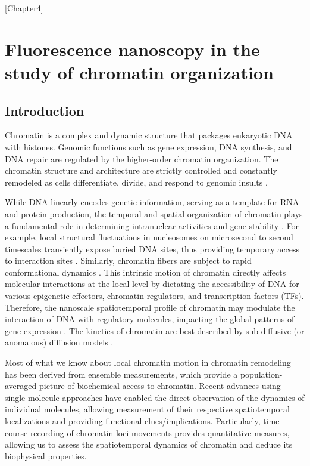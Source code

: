 [Chapter4]

\chapter{Fluorescence nanoscopy in the study of chromatin organization}

\section{Introduction}

Chromatin is a complex and dynamic structure that packages eukaryotic DNA with histones. Genomic functions such as gene expression, DNA synthesis, and DNA repair are regulated by the higher-order chromatin organization. The chromatin structure and architecture are strictly controlled and constantly remodeled as cells differentiate, divide, and respond to genomic insults \parencite{Auerbach2009,Chien2009,Clapier2009,Misteli2007,Vidi2014}.

While DNA linearly encodes genetic information, serving as a template for RNA and protein production, the temporal and spatial organization of chromatin plays a fundamental role in determining intranuclear activities and gene stability \parencite{Cuvier2017,Dion2013}. For example, local structural fluctuations in nucleosomes on microsecond to second timescales transiently expose buried DNA sites, thus providing temporary access to interaction sites \parencite{Choy2012}. Similarly, chromatin fibers are subject to rapid conformational dynamics \parencite{Li2016}. This intrinsic motion of chromatin directly affects molecular interactions at the local level by dictating the accessibility of DNA for various epigenetic effectors, chromatin regulators, and transcription factors (TFs). Therefore, the nanoscale spatiotemporal profile of chromatin may modulate the interaction of DNA with regulatory molecules, impacting the global patterns of gene expression \parencite{Bintu2018,Boettiger2016,Grant2018,Xu2018}. The kinetics of chromatin are best described by sub-diffusive (or anomalous) diffusion models \parencite{Fierz2019,Shukron2019}.

Most of what we know about local chromatin motion in chromatin remodeling has been derived from ensemble measurements, which provide a population-averaged picture of biochemical access to chromatin. Recent advances using single-molecule approaches have enabled the direct observation of the dynamics of individual molecules, allowing measurement of their respective spatiotemporal localizations and providing functional clues/implications. Particularly, time-course recording of chromatin loci movements provides quantitative measures, allowing us to assess the spatiotemporal dynamics of chromatin and deduce its biophysical properties.

